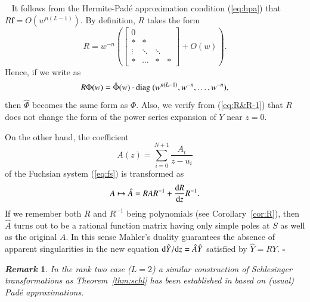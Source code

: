 \documentclass[12pt]{article}
\newtheorem{remark}[thm]{\it Remark}
\numberwithin{equation}{section}
\def\pf{\noindent{\it Proof.} \ }
\def\qed{\hfill $\square$}
\begin{document}
\pf 
It follows from the Hermite-Pad\'e approximation condition (\ref{eq:hpa})
that 
$R  {\boldsymbol f}=O(w^{n (L-1)})$.
By definition, $R$ takes the form 
\begin{equation} \label{eq:R}
R
= 
w^{-n}
\left(
\begin{bmatrix}
0 &  & &\\ 
*&*&  & \\ 
\vdots&\ddots&\ddots    &\\ 
*&\cdots&*&*
\end{bmatrix} 
+O(w)
\right). 
\end{equation}
Hence, if  we write as
\[
R \Phi(w) = 
\hat{\Phi}(w) 
\cdot {\rm diag \ } 
(w^{n(L-1)}, w^{-n}, \ldots,w^{-n}),
\]
then $\hat{\Phi}$ becomes the same form as $\Phi$.
Also, we verify from (\ref{eq:R&R-1}) that
$R$ does not change the form of the power series expansion of $Y$
near $z=0$.

On the other hand, 
the coefficient
\[
A(z)=
\sum_{i=0}^{N+1} \frac{A_i}{z-u_i} 
\]
of the Fuchsian system  (\ref{eq:fs}) is transformed as
\begin{equation}
\label{eq:AtoA}
A \mapsto \hat{A}=R A R^{-1} + \frac{{\rm d} R}{{\rm d}z}R^{-1} .
\end{equation}
If we remember both $R$ and $R^{-1}$ being polynomials
(see Corollary~\ref{cor:R}),
then $\hat{A}$ turns out to be
a rational function matrix having only simple poles at $S$ 
as well as the original $A$.
In this sense
Mahler's duality guarantees the absence of apparent singularities in the new equation ${\rm d} \hat{Y}/{{\rm d} z}
=  \hat{A} \hat{Y}$
satisfied by $ \hat{Y}=RY$.
\qed


\begin{remark}\rm
In the rank two case ($L=2$)
a similar construction of 
Schlesinger transformations
as Theorem~\ref{thm:schl}
has been established in 
\cite{man12}
based on 
 (usual)
Pad\'e approximations.
\end{remark}
\end{document}
